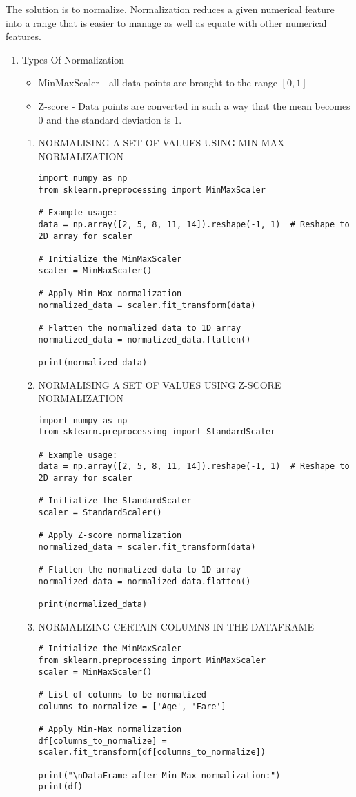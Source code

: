 \documentclass[11pt]{article}
\begin{document}
The solution is to normalize. Normalization reduces a given numerical feature into a range that is easier to manage as well as equate with other numerical features.
\begin{enumerate}
\item Types Of Normalization
\label{sec:org4a01d6a}
\begin{itemize}
\item MinMaxScaler - all data points are brought to the range \([0,1]\)
\item Z-score - Data points are converted in such a way that the mean becomes 0 and the standard deviation is 1.
\end{itemize}
\begin{enumerate}
\item NORMALISING A SET OF VALUES USING MIN MAX NORMALIZATION
\label{sec:org6baf52a}
\begin{verbatim}
import numpy as np
from sklearn.preprocessing import MinMaxScaler

# Example usage:
data = np.array([2, 5, 8, 11, 14]).reshape(-1, 1)  # Reshape to 2D array for scaler

# Initialize the MinMaxScaler
scaler = MinMaxScaler()

# Apply Min-Max normalization
normalized_data = scaler.fit_transform(data)

# Flatten the normalized data to 1D array
normalized_data = normalized_data.flatten()

print(normalized_data)
\end{verbatim}
\item NORMALISING A SET OF VALUES USING Z-SCORE NORMALIZATION
\label{sec:org0d79717}
\begin{verbatim}
import numpy as np
from sklearn.preprocessing import StandardScaler

# Example usage:
data = np.array([2, 5, 8, 11, 14]).reshape(-1, 1)  # Reshape to 2D array for scaler

# Initialize the StandardScaler
scaler = StandardScaler()

# Apply Z-score normalization
normalized_data = scaler.fit_transform(data)

# Flatten the normalized data to 1D array
normalized_data = normalized_data.flatten()

print(normalized_data)
\end{verbatim}
\item NORMALIZING CERTAIN COLUMNS IN THE DATAFRAME
\label{sec:org9b24003}
\begin{verbatim}
# Initialize the MinMaxScaler
from sklearn.preprocessing import MinMaxScaler
scaler = MinMaxScaler()

# List of columns to be normalized
columns_to_normalize = ['Age', 'Fare']

# Apply Min-Max normalization
df[columns_to_normalize] = scaler.fit_transform(df[columns_to_normalize])

print("\nDataFrame after Min-Max normalization:")
print(df)
\end{verbatim}
\end{enumerate}
\end{enumerate}
\end{document}
